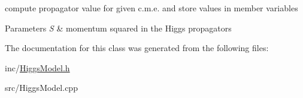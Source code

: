 compute propagator value for given c.\-m.\-e. and store values in member variables 


\begin{DoxyParams}{Parameters}
{\em S} & momentum squared in the Higgs propagators \\
\hline
\end{DoxyParams}


The documentation for this class was generated from the following files\-:\begin{DoxyCompactItemize}
\item 
inc/\hyperlink{HiggsModel_8h}{Higgs\-Model.\-h}\item 
src/Higgs\-Model.\-cpp\end{DoxyCompactItemize}
